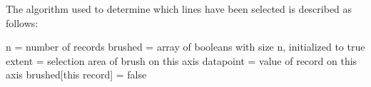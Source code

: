 \documentclass[]{article}
\begin{document}
			\par The algorithm used to determine which lines have been selected is described as follows:\\
			
			\begin{algorithm}[H]
				\SetAlgoLined
				
				n = number of records\;
				brushed = array of booleans with size n, initialized to true\;
				 {
					extent = selection area of brush on this axis\;
					 {
						datapoint = value of record on this axis\;
						 {
							brushed[this record] = false\;	
						}
					}
				}

			\end{algorithm}
\end{document}
